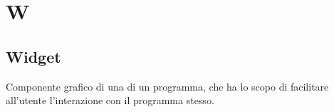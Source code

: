 \section*{W}
\markright{}

\subsection*{Widget}
Componente grafico di una  di un programma, che ha lo scopo di facilitare all'utente l'interazione con il programma stesso.